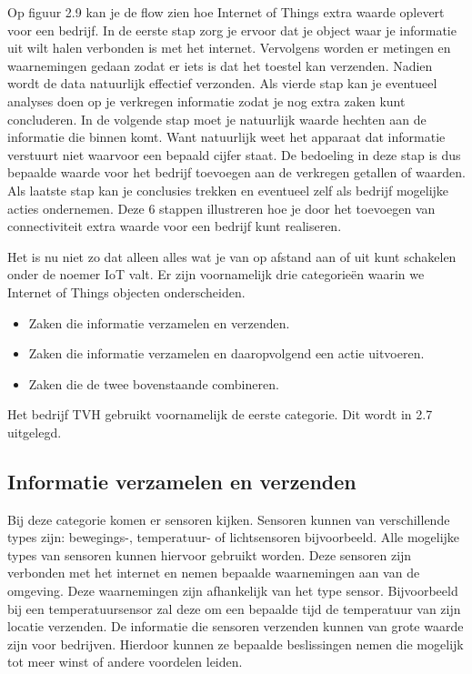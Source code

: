 Op figuur 2.9 kan je de flow zien hoe Internet of Things extra waarde oplevert voor een bedrijf. In de eerste stap zorg je ervoor dat je object waar je informatie uit wilt halen verbonden is met het internet. Vervolgens worden er metingen en waarnemingen gedaan zodat er iets is dat het toestel kan verzenden. Nadien wordt de data natuurlijk effectief verzonden. Als vierde stap kan je eventueel analyses doen op je verkregen informatie zodat je nog extra zaken kunt concluderen. In de volgende stap moet je natuurlijk waarde hechten aan de informatie die binnen komt. Want natuurlijk weet het apparaat dat informatie verstuurt niet waarvoor een bepaald cijfer staat. De bedoeling in deze stap is dus bepaalde waarde voor het bedrijf toevoegen aan de verkregen getallen of waarden. Als laatste stap kan je conclusies trekken en eventueel zelf als bedrijf mogelijke acties ondernemen. Deze 6 stappen illustreren hoe je door het toevoegen van connectiviteit extra waarde voor een bedrijf kunt realiseren.

Het is nu niet zo dat alleen alles wat je van op afstand aan of uit kunt schakelen onder de noemer IoT valt. Er zijn voornamelijk drie categorieën waarin we Internet of Things objecten onderscheiden.

\begin{itemize}
    \item Zaken die informatie verzamelen en verzenden.
    \item Zaken die informatie verzamelen en daaropvolgend een actie uitvoeren.
    \item Zaken die de twee bovenstaande combineren.
\end{itemize}

Het bedrijf TVH gebruikt voornamelijk de eerste categorie. Dit wordt in 2.7 uitgelegd.

\subsection{Informatie verzamelen en verzenden}
Bij deze categorie komen er sensoren kijken. Sensoren kunnen van verschillende types zijn: bewegings-, temperatuur- of lichtsensoren bijvoorbeeld. Alle mogelijke types van sensoren kunnen hiervoor gebruikt worden. Deze sensoren zijn verbonden met het internet en nemen bepaalde waarnemingen aan van de omgeving. Deze waarnemingen zijn afhankelijk van het type sensor. Bijvoorbeeld bij een temperatuursensor zal deze om een bepaalde tijd de temperatuur van zijn locatie verzenden. De informatie die sensoren verzenden kunnen van grote waarde zijn voor bedrijven. Hierdoor kunnen ze bepaalde beslissingen nemen die mogelijk tot meer winst of andere voordelen leiden. 

